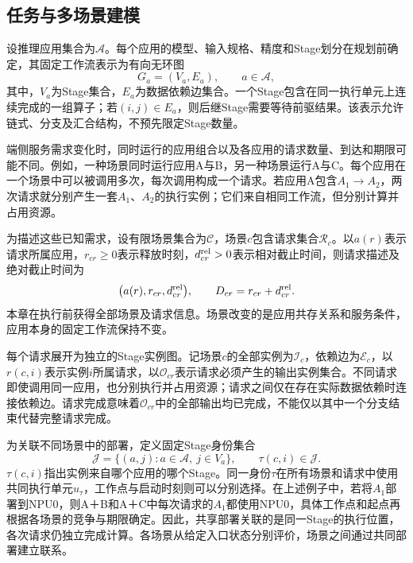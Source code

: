 \subsection{任务与多场景建模}

设推理应用集合为\(\mathcal A\)。每个应用的模型、输入规格、精度和Stage划分在规划前确定，其固定工作流表示为有向无环图
\begin{equation}
G_a=(V_a,E_a),\qquad a\in\mathcal A,
\label{eq:application-dag}
\end{equation}
其中，\(V_a\)为Stage集合，\(E_a\)为数据依赖边集合。一个Stage包含在同一执行单元上连续完成的一组算子；若\((i,j)\in E_a\)，则后继Stage需要等待前驱结果。该表示允许链式、分支及汇合结构，不预先限定Stage数量。

端侧服务需求变化时，同时运行的应用组合以及各应用的请求数量、到达和期限可能不同。例如，一种场景同时运行应用A与B，另一种场景运行A与C。每个应用在一个场景中可以被调用多次，每次调用构成一个请求。若应用A包含\(A_1\rightarrow A_2\)，两次请求就分别产生一套\(A_1\)、\(A_2\)的执行实例；它们来自相同工作流，但分别计算并占用资源。

为描述这些已知需求，设有限场景集合为\(\mathcal C\)，场景\(c\)包含请求集合\(\mathcal R_c\)。以\(a(r)\)表示请求所属应用，\(r_{cr}\ge0\)表示释放时刻，\(d^{\rm rel}_{cr}>0\)表示相对截止时间，则请求描述及绝对截止时间为
\begin{equation}
\bigl(a(r),r_{cr},d^{\rm rel}_{cr}\bigr),\qquad
D_{cr}=r_{cr}+d^{\rm rel}_{cr}.
\label{eq:request-description}
\end{equation}
本章在执行前获得全部场景及请求信息。场景改变的是应用共存关系和服务条件，应用本身的固定工作流保持不变。

每个请求展开为独立的Stage实例图。记场景\(c\)的全部实例为\(\mathcal I_c\)，依赖边为\(\mathcal E_c\)，以\(r(c,i)\)表示实例\(i\)所属请求，以\(\mathcal O_{cr}\)表示请求必须产生的输出实例集合。不同请求即使调用同一应用，也分别执行并占用资源；请求之间仅在存在实际数据依赖时连接依赖边。请求完成意味着\(\mathcal O_{cr}\)中的全部输出均已完成，不能仅以其中一个分支结束代替完整请求完成。

为关联不同场景中的部署，定义固定Stage身份集合
\begin{equation}
\mathcal J=\{(a,j):a\in\mathcal A,\ j\in V_a\},\qquad
\tau(c,i)\in\mathcal J.
\label{eq:stage-identity}
\end{equation}
\(\tau(c,i)\)指出实例来自哪个应用的哪个Stage。同一身份\(\tau\)在所有场景和请求中使用共同执行单元\(u_\tau\)，工作点与启动时刻则可以分别选择。在上述例子中，若将\(A_1\)部署到NPU0，则A＋B和A＋C中每次请求的\(A_1\)都使用NPU0，具体工作点和起点再根据各场景的竞争与期限确定。因此，共享部署关联的是同一Stage的执行位置，各次请求仍独立完成计算。各场景从给定入口状态分别评价，场景之间通过共同部署建立联系。

